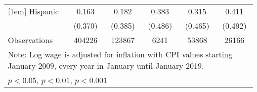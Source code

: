 \begin{table}[htbp]
\begin{tabular}{l*{5}{c}}
[1em]
Hispanic            &       0.163         &       0.182         &       0.383         &       0.315         &       0.411         \\
                    &     (0.370)         &     (0.385)         &     (0.486)         &     (0.465)         &     (0.492)         \\
\hline
Observations        &      404226         &      123867         &        6241         &       53868         &       26166         \\
\hline\hline
\multicolumn{6}{l}{\footnotesize Note: Log wage is adjusted for inflation with CPI values starting January 2009, every year in January until January 2019.}\\
\multicolumn{6}{l}{\footnotesize \sym{*} \(p<0.05\), \sym{**} \(p<0.01\), \sym{***} \(p<0.001\)}\\
\end{tabular}
\end{table}
